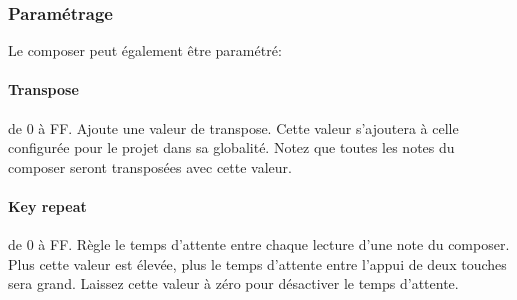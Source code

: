 \subsubsection{Paramétrage}

Le composer peut également être paramétré:


\paragraph{Transpose} de 0 à FF.
Ajoute une valeur de transpose.
Cette valeur s'ajoutera à celle configurée pour le projet dans sa globalité.
Notez que toutes les notes du composer seront transposées avec cette valeur.

\paragraph{Key repeat} de 0 à FF.
Règle le temps d'attente entre chaque lecture d'une note du composer.
Plus cette valeur est élevée, plus le temps d'attente entre l'appui de deux touches sera grand.
Laissez cette valeur à zéro pour désactiver le temps d'attente.
